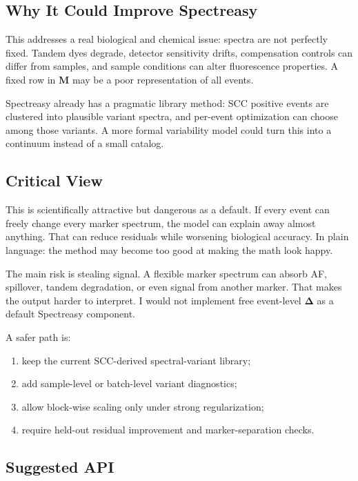 \documentclass[11pt]{article}
\newcommand{\M}{\mathbf{M}}
\newcommand{\DeltaM}{\boldsymbol{\Delta}}
\begin{document}
\subsection*{Why It Could Improve Spectreasy}

This addresses a real biological and chemical issue: spectra are not perfectly
fixed. Tandem dyes degrade, detector sensitivity drifts, compensation controls
can differ from samples, and sample conditions can alter fluorescence
properties. A fixed row in \(\M\) may be a poor representation of all events.

Spectreasy already has a pragmatic library method: SCC positive events are
clustered into plausible variant spectra, and per-event optimization can choose
among those variants. A more formal variability model could turn this into a
continuum instead of a small catalog.

\subsection*{Critical View}

This is scientifically attractive but dangerous as a default. If every event can
freely change every marker spectrum, the model can explain away almost anything.
That can reduce residuals while worsening biological accuracy. In plain
language: the method may become too good at making the math look happy.

The main risk is stealing signal. A flexible marker spectrum can absorb AF,
spillover, tandem degradation, or even signal from another marker. That makes
the output harder to interpret. I would not implement free event-level
\(\DeltaM\) as a default Spectreasy component.

A safer path is:
\begin{enumerate}
  \item keep the current SCC-derived spectral-variant library;
  \item add sample-level or batch-level variant diagnostics;
  \item allow block-wise scaling only under strong regularization;
  \item require held-out residual improvement and marker-separation checks.
\end{enumerate}

\subsection*{Suggested API}
\end{document}
